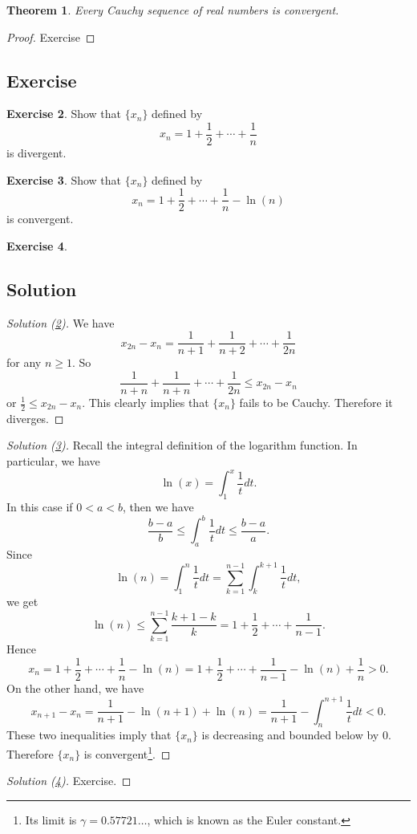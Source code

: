\documentclass[	DIV=calc,paper=a4,fontsize=11pt]{scrartcl}	 	%
\newtheorem{thm}{Theorem}[section]
\theoremstyle{definition}
\newtheorem{exer}[thm]{Exercise}
\theoremstyle{plain}
\theoremstyle{remark}
\begin{document}
\begin{thm}
Every Cauchy sequence of real numbers is convergent.
\end{thm}

\begin{proof}
Exercise
\end{proof}

\newpage
\subsection{Exercise}
\begin{exer}\label{041}
Show that $\{x_n\}$ defined by
\[x_n = 1 +\frac{1}{2}+\cdots +\frac{1}{n}\]
is divergent.
\end{exer}

\begin{exer}\label{042}
Show that $\{x_n\}$ defined by
\[x_n = 1 +\frac{1}{2}+ \cdots +\frac{1}{n}-\ln(n)\]
is convergent.
\end{exer}

\begin{exer}\label{043}
\end{exer}

\newpage
\subsection*{Solution}
\begin{proof}[Solution (\ref{041})]
We have
\[x_{2n}- x_n =\frac{1}{n+1}+\frac{1}{n+2} +\cdots +\frac{1}{2n}\]
for any $n\ge1$. So
\[\frac{1}{n+n}+\frac{1}{n+n} +\cdots +\frac{1}{2n}\leq x_{2n}- x_n\]
or $\frac{1}{2} \leq x_{2n}-x_n$. This clearly implies that $\{x_n\}$ fails to be Cauchy. Therefore it diverges.
\end{proof}
\begin{proof}[Solution (\ref{042})]
Recall the integral definition of the logarithm function. In particular, we have
\[\ln(x) = \int_1^x \frac{1}{t}dt.\]
In this case if $0 < a < b$, then we have
\[\frac{b-a}{b}\leq \int_a^b\frac{1}{t} dt\leq \frac{b-a}{a}.\]
Since
\[\ln(n) = \int_1^n\frac{1}{t}dt = \sum_{k=1}^{n-1}\int_k^{k+1}\frac{1}{t} dt,\]
we get
\[\ln(n)\leq \sum_{k=1}^{n-1}\frac{k+1-k}{k} = 1 +\frac{1}{2}+\cdots +\frac{1}{n-1}.\]
Hence
\[x_n = 1 +\frac{1}{2}+\cdots +\frac{1}{n}-\ln(n) = 1 + \frac{1}{2}+\cdots +\frac{1}{n-1}-\ln(n)+\frac{1}{n}>0.\]
On the other hand, we have
\[x_{n+1}-x_n =\frac{1}{n+1}-\ln(n + 1) + \ln(n) = \frac{1}{n + 1}-\int_n^{n+1}\frac{1}{t}dt < 0.\]
These two inequalities imply that $\{x_n\}$ is decreasing and bounded below by $0$. Therefore $\{x_n\}$ is convergent\footnote{Its limit is $\gamma= 0.57721\ldots$, which is known as the Euler constant.}.
\end{proof}
\begin{proof}[Solution (\ref{043})]
Exercise.
\end{proof}
\end{document}
